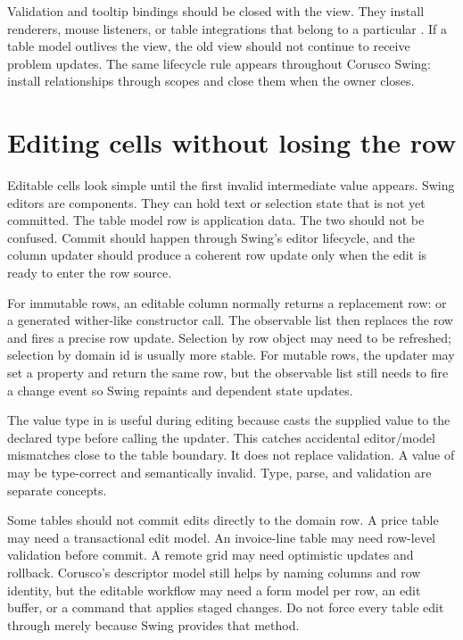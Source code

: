 Validation and tooltip bindings should be closed with the view. They install
renderers, mouse listeners, or table integrations that belong to a particular
. If a table model outlives the view, the old view should not
continue to receive problem updates. The same lifecycle rule appears
throughout Corusco Swing: install relationships through scopes and close them
when the owner closes.

\section{Editing cells without losing the row}

Editable cells look simple until the first invalid intermediate value appears.
Swing editors are components. They can hold text or selection state that is
not yet committed. The table model row is application data. The two should not
be confused. Commit should happen through Swing's editor lifecycle, and the
column updater should produce a coherent row update only when the edit is
ready to enter the row source.

For immutable rows, an editable column normally returns a replacement row:
 or a generated wither-like
constructor call. The observable list then replaces the row and fires a precise
row update. Selection by row object may need to be refreshed; selection by
domain id is usually more stable. For mutable rows, the updater may set a
property and return the same row, but the observable list still needs to fire a
change event so Swing repaints and dependent state updates.

The value type in  is useful during editing because
 casts the supplied value to the declared type before
calling the updater. This catches accidental editor/model mismatches close to
the table boundary. It does not replace validation. A  value
of  may be type-correct and semantically invalid. Type, parse, and
validation are separate concepts.

Some tables should not commit edits directly to the domain row. A price table
may need a transactional edit model. An invoice-line table may need row-level
validation before commit. A remote grid may need optimistic updates and
rollback. Corusco's descriptor model still helps by naming columns and row
identity, but the editable workflow may need a form model per row, an edit
buffer, or a command that applies staged changes. Do not force every table
edit through  merely because Swing provides that method.

